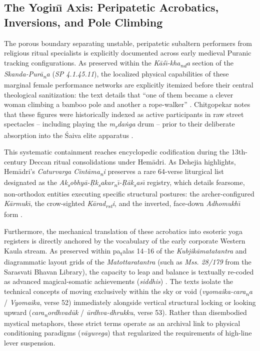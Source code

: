 \documentclass[11pt,twoside,letterpaper]{article}
\begin{document}
\subsection{The Yogin\={\i} Axis: Peripatetic Acrobatics, Inversions, and Pole Climbing}
The porous boundary separating unstable, peripatetic subaltern performers from religious ritual specialists is explicitly documented across early medieval Puranic tracking configurations. As preserved within the \textit{K\={a}\'{s}\={\i}-kha\textsubscript{n}\textsubscript{d}a} section of the \textit{Skanda-Pur\={a}\textsubscript{n}a} (\textit{SP 4.1.45.11}), the localized physical capabilities of these marginal female performance networks are explicitly itemized before their central theological sanitization: the text details that ``one of them became a clever woman climbing a bamboo pole and another a rope-walker'' \cite{Shastri1991}. Chitgopekar notes that these figures were historically indexed as active participants in raw street spectacles -- including playing the \textit{m\textsubscript{r}da\.{n}ga} drum -- prior to their deliberate absorption into the Śaiva elite apparatus \cite{Chitgopekar2002}. 

This systematic containment reaches encyclopedic codification during the 13th-century Deccan ritual consolidations under Hem\={a}dri. As Dehejia highlights, Hem\={a}dri’s \textit{Caturvarga Cint\={a}ma\textsubscript{n}i} preserves a rare 64-verse liturgical list designated as the \textit{Ak\textsubscript{s}obhy\={a}-\d{R}k\textsubscript{s}akar\textsubscript{n}\={\i}-\d{R}\={a}k\textsubscript{s}as\={\i}} registry, which details fearsome, non-orthodox entities executing specific structural postures: the archer-configured \textit{K\={a}rmuk\={\i}}, the crow-sighted \textit{K\={a}rad\textsubscript{r}\textsubscript{s}\textsubscript{t}i}, and the inverted, face-down \textit{Adhomukh\={\i}} form \cite{Dehejia1986}. 

Furthermore, the mechanical translation of these acrobatics into esoteric yoga registers is directly anchored by the vocabulary of the early corporate Western Kaula stream. As preserved within pa\textsubscript{t}alas 14–16 of the \textit{Kubjik\={a}matatantra} and diagrammatic layout grids of the \textit{Matottaratantra} (such as \textit{Mss. 28/179} from the Sarasvati Bhavan Library), the capacity to leap and balance is textually re-coded as advanced magical-somatic achievements (\textit{siddhis}) \cite{Dehejia1986}. The texts isolate the technical concepts of moving exclusively within the sky or void (\textit{vyomaika-cara\textsubscript{n}a} / \textit{Vyomaika}, verse 52) immediately alongside vertical structural locking or looking upward (\textit{cara\textsubscript{n}ordhvad\={u}k} / \textit{\={u}rdhva-dhrukku}, verse 53). Rather than disembodied mystical metaphors, these strict terms operate as an archival link to physical conditioning paradigms (\textit{v\={a}yuvega}) that regularized the requirements of high-line lever suspension.
\end{document}
